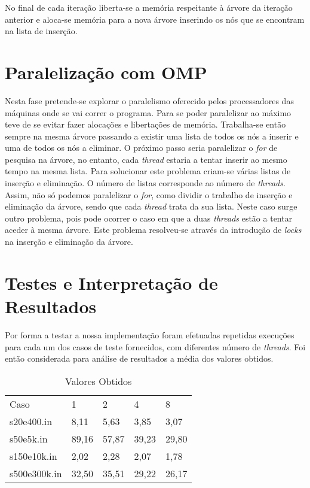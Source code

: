 \documentclass[twoside,twocolumn]{article}
\begin{document}
No final de cada iteração liberta-se a memória respeitante à árvore da iteração anterior e aloca-se memória para a nova árvore inserindo os nós que se encontram na lista de inserção.

\section{Paralelização com OMP}

Nesta fase pretende-se explorar o paralelismo oferecido pelos processadores das máquinas onde se vai correr o programa. Para se poder paralelizar ao máximo teve de se evitar fazer alocações e libertações de memória. Trabalha-se então sempre na mesma árvore passando a existir uma lista de todos os nós a inserir e uma de todos os nós a eliminar. O próximo passo seria paralelizar o \textit{for} de pesquisa na árvore, no entanto, cada \textit{thread} estaria a tentar inserir ao mesmo tempo na mesma lista. Para solucionar este problema criam-se várias listas de inserção e eliminação. O número de listas corresponde ao número de \textit{threads}. Assim, não só podemos paralelizar o \textit{for}, como dividir o trabalho de inserção e eliminação da árvore, sendo que cada \textit{thread} trata da sua lista. Neste caso surge outro problema, pois pode ocorrer o caso em que a duas \textit{threads} estão a tentar aceder à mesma árvore. Este problema resolveu-se através da introdução de \textit{locks} na inserção e eliminação da árvore.

\section{Testes e Interpretação de Resultados}

Por forma a testar a nossa implementação foram efetuadas repetidas execuções para cada um dos casos de teste fornecidos,
com diferentes número de \textit{threads}. Foi então considerada para análise de resultados a média dos valores obtidos.

\begin{table}[H]
\centering
\begin{tabular}{lllll}
Caso  & 1         & 2         & 4         & 8         \\
s20e400.in    & 8,11  & 5,63  & 3,85  & 3,07  \\
s50e5k.in     & 89,16 & 57,87 & 39,23 & 29,80 \\
s150e10k.in   & 2,02  & 2,28  & 2,07  & 1,78  \\
s500e300k.in  & 32,50 & 35,51 & 29,22 & 26,17
\end{tabular}
\caption{Valores Obtidos}
\label{search}
\end{table}
\end{document}
